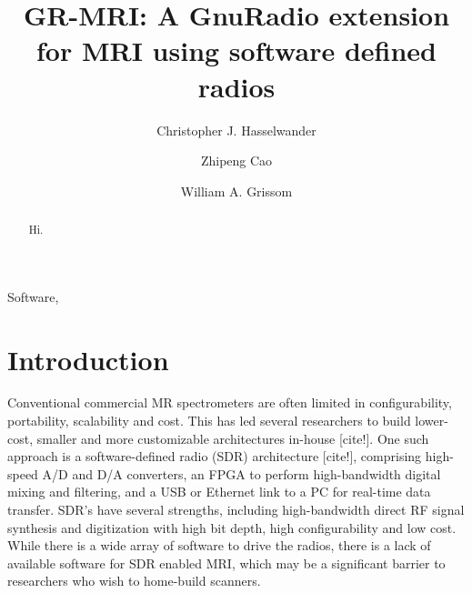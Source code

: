 \documentclass[review]{elsarticle}
\newif\ifmarkedup
\renewcommand{\textcolor}[1]{}
\begin{document}
\begin{frontmatter}
\ifmarkedup
	\title{\textcolor{red}{Highlighted Copy:}\\GR-MRI: A GnuRadio extension for MRI using software defined radios}
\else
	\title{GR-MRI: A GnuRadio extension for MRI using software defined radios}
\fi

\author[bme,vuiis]{Christopher J. Hasselwander}
\author[bme,vuiis]{Zhipeng Cao}
\author[bme,rad,vuiis]{William A. Grissom}


\address[bme]{Department of Biomedical Engineering, Vanderbilt University, Nashville, Tennessee, USA}
\address[rad]{Department of Radiology and Radiological Sciences, Vanderbilt University, Nashville, Tennessee, USA}
\address[vuiis]{Vanderbilt University Institute of Imaging Science, Nashville, Tennessee, USA}
\begin{abstract}
Hi.
\end{abstract}

\begin{keyword}
Software,
\end{keyword}
\end{frontmatter}

\section{Introduction}

\indent Conventional commercial MR spectrometers are often limited in configurability, portability, scalability and cost. This has led several researchers to build lower-cost, smaller and more customizable architectures in-house [cite!]. One such approach is a software-defined radio (SDR) architecture [cite!], comprising high-speed A/D and D/A converters, an FPGA to perform high-bandwidth digital mixing and filtering, and a USB or Ethernet link to a PC for real-time data transfer. SDR's have several strengths, including high-bandwidth direct RF signal synthesis and digitization with high bit depth, high configurability and low cost.  While there is a wide array of software to drive the radios, there is a lack of available software for SDR enabled MRI, which may be a significant barrier to researchers who wish to home-build scanners.
\end{document}
